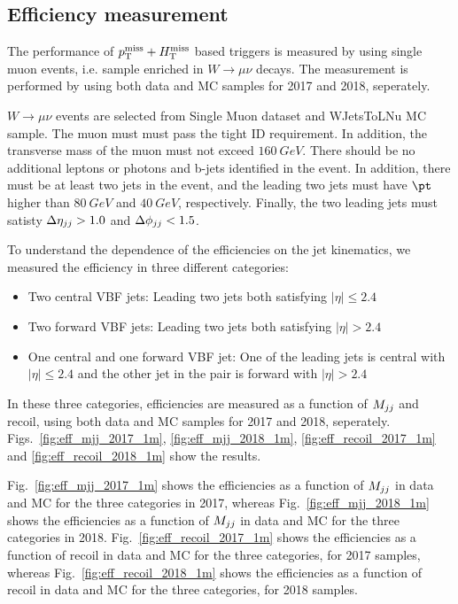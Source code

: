 \subsection{Efficiency measurement}

The performance of $p_{\mathrm{T}}^{\mathrm{miss}} + H_{\mathrm{T}}^{\mathrm{miss}}$ based triggers is measured by using single muon events, i.e. sample enriched in
$W \rightarrow \mu\nu$ decays. The measurement is performed by using both data and MC samples for 2017 and 2018, seperately.

$W \rightarrow \mu\nu$ events are selected from Single Muon dataset and WJetsToLNu MC sample. 
The muon must must pass the tight ID requirement. In addition, the transverse mass of the muon must not exceed $160 \ GeV$. 
There should be no additional leptons or photons and b-jets identified in the event. In addition, there must be at least 
two jets in the event, and the leading two jets must have $\pt$ higher than $80 \ GeV$ and $40 \ GeV$, respectively. 
Finally, the two leading jets must satisty $\Delta \eta_{jj} > 1.0$ and $\Delta \phi_{jj} < 1.5$.

To understand the dependence of the efficiencies on the jet kinematics, we measured the efficiency in three different categories:

\begin{itemize}
    \item Two central VBF jets: Leading two jets both satisfying $|\eta| \leq 2.4$
    \item Two forward VBF jets: Leading two jets both satisfying $|\eta| > 2.4$
    \item One central and one forward VBF jet: One of the leading jets is central with $|\eta| \leq 2.4$ and the other jet in the pair is forward 
    with $|\eta| > 2.4$
\end{itemize}

In these three categories, efficiencies are measured as a function of $M_{jj}$ and recoil, using both data and MC samples for 2017 and 2018,
seperately. Figs.~\ref{fig:eff_mjj_2017_1m}, \ref{fig:eff_mjj_2018_1m}, \ref{fig:eff_recoil_2017_1m} and \ref{fig:eff_recoil_2018_1m} show 
the results. 

Fig.~\ref{fig:eff_mjj_2017_1m} shows the efficiencies as a function of $M_{jj}$ in data and MC for the three categories in 2017, 
whereas Fig.~\ref{fig:eff_mjj_2018_1m} shows the efficiencies as a function of $M_{jj}$ in data and MC for the three categories in 2018. 
Fig.~\ref{fig:eff_recoil_2017_1m} shows the efficiencies as a function of recoil in data and MC for the three categories, 
for 2017 samples, whereas Fig.~\ref{fig:eff_recoil_2018_1m} shows the efficiencies as a function of recoil in data and MC 
for the three categories, for 2018 samples. 

